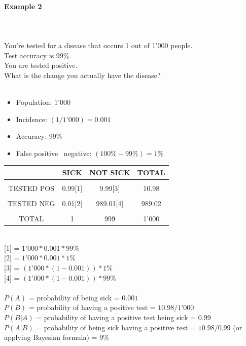 \documentclass{article}
\begin{document}
\paragraph{Example 2}\mbox{} \\
\mbox{} \\
You’re tested for a disease that occurs 1 out of 1’000 people. \\ 
Test accuracy is 99\%. \\ 
You are tested positive. \\ 
What is the change you actually have the disease? \\ 
\mbox{} \\
\begin{itemize}
    \item Population: $\text{1'000}$
    \item Incidence: $(1/\text{1’000}) = \text{0.001}$
    \item Accuracy: 99\%
    \item False positive \ negative: $(100\% - 99\%) = 1\%$
\end{itemize}

\begin{center}
\begin{tabular}{|c|c|c|c|}
\hline
 & SICK & NOT SICK & TOTAL \\ \hline
&&&\\[-1em]
TESTED POS & 0.99[1] & 9.99[3] & 10.98 \\ \hline
&&&\\[-1em]
TESTED NEG & 0.01[2] & 989.01[4] & 989.02 \\ \hline
&&&\\[-1em]
TOTAL & 1 & 999 & 1'000 \\ 
\hline
\end{tabular}
\end{center}

\mbox{} \\  

{[1]} = $\text{1’000} * 0.001 * 99\%$ \\ 
{[2]} = $\text{1’000} * 0.001 * 1\%$ \\ 
{[3]} = $(\text{1’000} * (1 - 0.001)) * 1\%$ \\ 
{[4]} = $(\text{1’000} * (1 - 0.001)) * 99\%$ \\

\mbox{} \\

$P(A)$ = probability of being sick = $0.001$ \\ 
$P(B)$ = probability of having a positive test = $10.98 / \text{1’000}$ \\ 
$P(B|A)$ = probability of having a positive test being sick = $0.99$ \\ 
$P(A|B)$ = probability of being sick having a positive test = $10.98 / 0.99$ (or applying Bayesian formula) = $9\%$ \\ 
\end{document}
